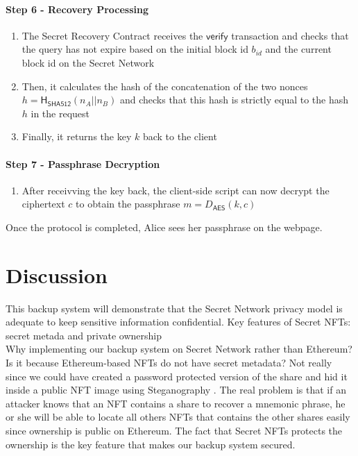 \documentclass[12pt]{article}
\newcommand{\ms}[1]{\ensuremath{\mathsf{#1}}}
\begin{document}
\paragraph{Step 6 - Recovery Processing}

\begin{enumerate}[label=5.\arabic*]
    \item The Secret Recovery Contract receives the $\ms{verify}$ transaction and checks that the query has not expire based on the initial block id $b_{id}$ and the current block id on the Secret Network
  \item Then, it calculates the hash of the concatenation of the two nonces $h=\ms{H_{\ms{SHA512}}}(n_A || n_B)$ and checks that this hash is strictly equal to the hash $h$ in the request
  \item Finally, it returns the key $k$ back to the client
\end{enumerate}

\paragraph{Step 7 - Passphrase Decryption}

\begin{enumerate}[label=7.\arabic*]
  \item After receivving the key back, the client-side script can now decrypt the ciphertext $c$ to obtain the passphrase $m=D_{\ms{AES}}(k, c)$
\end{enumerate}

Once the protocol is completed, Alice sees her passphrase on the webpage.

\section{Discussion}

This backup system will demonstrate that the Secret Network privacy model is adequate to keep sensitive information confidential. Key features of Secret NFTs: secret metada and private ownership \\ 

Why implementing our backup system on Secret Network rather than Ethereum? Is it because Ethereum-based NFTs do not have secret metadata? Not really since we could have created a password protected version of the share and hid it inside a public NFT image using Steganography \cite{Steganography}. The real problem is that if an attacker knows that an NFT contains a share to recover a mnemonic phrase, he or she will be able to locate all others NFTs that contains the other shares easily since ownership is public on Ethereum. The fact that Secret NFTs protects the ownership is the key feature that makes our backup system secured. 
\end{document}
